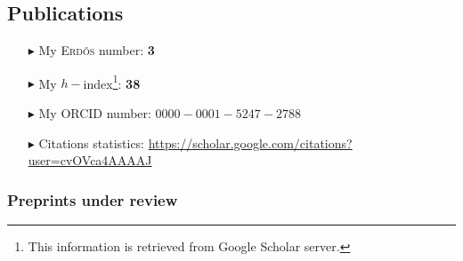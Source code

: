 \separator
\subsection{Publications}

\begin{itemize}
  \item[$\blacktriangleright$] My \textsc{Erd\H{o}s} number: \textbf{3}
  \item[$\blacktriangleright$] My $h-$index\footnote{This information is retrieved from Google Scholar server.}: \textbf{38}
  \item[$\blacktriangleright$] My ORCID number: $0000-0001-5247-2788$
  \item[$\blacktriangleright$] Citations statistics: \url{https://scholar.google.com/citations?user=cvOVca4AAAAJ}
\end{itemize}

\separator
\subsubsection{Preprints under review}

